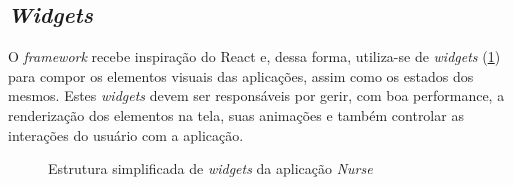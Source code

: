\subsection{\textit{Widgets}}
\label{cap2:SubSec:Widgets}
O \textit{framework} recebe inspiração do React e, dessa forma, utiliza-se de \textit{widgets} (\ref{fig:nurse-widget-tree}) para compor os elementos visuais das aplicações, assim como os estados dos mesmos. %
Estes \textit{widgets} devem ser responsáveis por gerir, com boa performance, a renderização dos elementos na tela, suas animações e também controlar as interações do usuário com a aplicação.

\begin{figure}[ht!]
    	
  \centering
            \qquad
    \caption[Estrutura simplificada de \textit{widgets} da aplicação \textit{Nurse}]{Estrutura simplificada de \textit{widgets} da aplicação \textit{Nurse}}
  
  \label{fig:nurse-widget-tree}
\end{figure}
  
